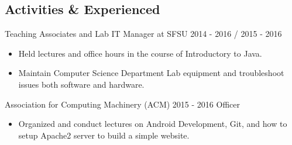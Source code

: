 \documentclass[letter]{res}
\begin{document}
\begin{resume}
\section{Activities \& Experienced}
\vspace{1mm}
 Teaching Associates and Lab IT Manager at SFSU 2014 - 2016 / 2015 - 2016 \vspace{1mm}
\begin{itemize}
\item Held lectures and office hours in the course of Introductory to Java.
\item Maintain Computer Science Department Lab equipment and troubleshoot issues both software and hardware.
\end{itemize}
Association for Computing Machinery (ACM) 2015 - 2016 Officer \vspace{1mm}
 \begin{itemize}
\item Organized and conduct lectures on Android Development, Git, and how to setup Apache2 server to build a simple website.
\end{itemize}
\end{resume}
\end{document}
